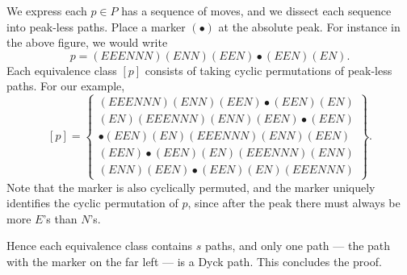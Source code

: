 We express each $p\in P$ has a sequence of moves, and we dissect each sequence into peak-less paths. Place a marker $(\bullet)$ at the absolute peak. For instance in the above figure, we would write \[p=(EEENNN)(ENN)(EEN)\bullet(EEN)(EN).\]
Each equivalence class $[p]$ consists of taking cyclic permutations of peak-less paths. For our example, \[ [p]=\begin{Bmatrix}(EEENNN)(ENN)(EEN)\bullet(EEN)(EN)\\ (EN)(EEENNN)(ENN)(EEN)\bullet(EEN)\\ \bullet(EEN)(EN)(EEENNN)(ENN)(EEN)\\ (EEN)\bullet(EEN)(EN)(EEENNN)(ENN)\\ (ENN)(EEN)\bullet(EEN)(EN)(EEENNN)\end{Bmatrix}.\]
Note that the marker is also cyclically permuted, and the marker uniquely identifies the cyclic permutation of $p$, since after the peak there must always be more $E$'s than $N$'s.

Hence each equivalence class contains $s$ paths, and only one path --- the path with the marker on the far left --- is a Dyck path. This concludes the proof.

